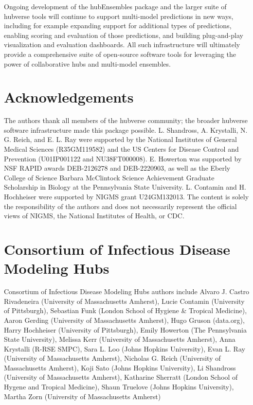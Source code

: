 \documentclass[
  letterpaper,
  DIV=11,
  numbers=noendperiod]{scrartcl}
\begin{document}
Ongoing development of the {hubEnsembles} package and the larger suite
of hubverse tools will continue to support multi-model predictions in
new ways, including for example expanding support for additional types
of predictions, enabling scoring and evaluation of those predictions,
and building plug-and-play visualization and evaluation dashboards. All
such infrastructure will ultimately provide a comprehensive suite of
open-source software tools for leveraging the power of collaborative
hubs and multi-model ensembles.

\section*{Acknowledgements}\label{acknowledgements}

The authors thank all members of the hubverse community; the broader
hubverse software infrastructure made this package possible. L.
Shandross, A. Krystalli, N. G. Reich, and E. L. Ray were supported by
the National Institutes of General Medical Sciences (R35GM119582) and
the US Centers for Disease Control and Prevention (U01IP001122 and
NU38FT000008). E. Howerton was supported by NSF RAPID awards DEB-2126278
and DEB-2220903, as well as the Eberly College of Science Barbara
McClintock Science Achievement Graduate Scholarship in Biology at the
Pennsylvania State University. L. Contamin and H. Hochheiser were
supported by NIGMS grant U24GM132013. The content is solely the
responsibility of the authors and does not necessarily represent the
official views of NIGMS, the National Institutes of Health, or CDC.

\section*{Consortium of Infectious Disease Modeling
Hubs}\label{consortium-of-infectious-disease-modeling-hubs}

Consortium of Infectious Disease Modeling Hubs authors include Alvaro J.
Castro Rivadeneira (University of Massachusetts Amherst), Lucie Contamin
(University of Pittsburgh), Sebastian Funk (London School of Hygiene \&
Tropical Medicine), Aaron Gerding (University of Massachusetts Amherst),
Hugo Gruson (data.org), Harry Hochheiser (University of Pittsburgh),
Emily Howerton (The Pennsylvania State University), Melissa Kerr
(University of Massachusetts Amherst), Anna Krystalli (R-RSE SMPC), Sara
L. Loo (Johns Hopkins University), Evan L. Ray (University of
Massachusetts Amherst), Nicholas G. Reich (University of Massachusetts
Amherst), Koji Sato (Johns Hopkins University), Li Shandross (University
of Massachusetts Amherst), Katharine Sherratt (London School of Hygene
and Tropical Medicine), Shaun Truelove (Johns Hopkins University),
Martha Zorn (University of Massachusetts Amherst)
\end{document}
